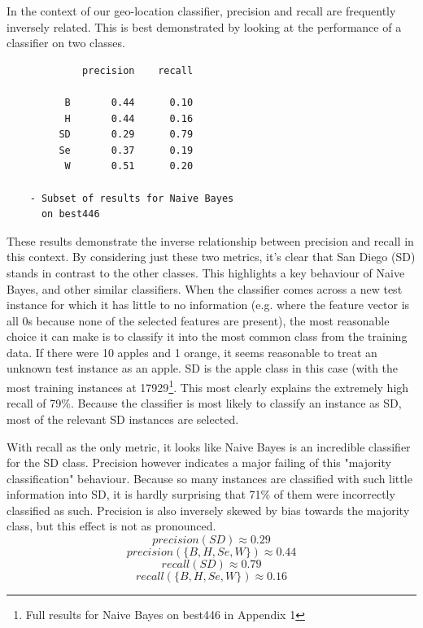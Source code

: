 \documentclass[twocolumn]{article}
\begin{document}
In the context of our geo-location classifier, precision and recall are frequently inversely related. This is best demonstrated by looking at the performance of a classifier on two classes.
\begin{verbatim}
             precision    recall

          B       0.44      0.10
          H       0.44      0.16
         SD       0.29      0.79
         Se       0.37      0.19
          W       0.51      0.20
          
    - Subset of results for Naive Bayes 
      on best446
\end{verbatim}
\clearpage
These results demonstrate the inverse relationship between precision and recall in this context. By considering just these two metrics, it's clear that San Diego (SD) stands in contrast to the other classes. This highlights a key behaviour of Naive Bayes, and other similar classifiers. When the classifier comes across a new test instance for which it has little to no information (e.g. where the feature vector is all 0s because none of the selected features are present), the most reasonable choice it can make is to classify it into the most common class from the training data. If there were 10 apples and 1 orange, it seems reasonable to treat an unknown test instance as an apple. SD is the apple class in this case (with the most training instances at 17929\footnote{Full results for Naive Bayes on best446 in Appendix 1}. This most clearly explains the extremely high recall of 79\%. Because the classifier is most likely to classify an instance as SD, most of the relevant SD instances are selected.

With recall as the only metric, it looks like Naive Bayes is an incredible classifier for the SD class. Precision however indicates a major failing of this "majority classification" behaviour. Because so many instances are classified with such little information into SD, it is hardly surprising that 71\% of them were incorrectly classified as such. Precision is also inversely skewed by bias towards the majority class, but this effect is not as pronounced.
\begin{equation}
precision(SD) \approx 0.29
\end{equation}
\begin{equation}
precision(\{B, H, Se, W\}) \approx 0.44
\end{equation}
\begin{equation}
recall(SD) \approx 0.79
\end{equation}
\begin{equation}
recall(\{B, H, Se, W\}) \approx 0.16
\end{equation}
\end{document}
